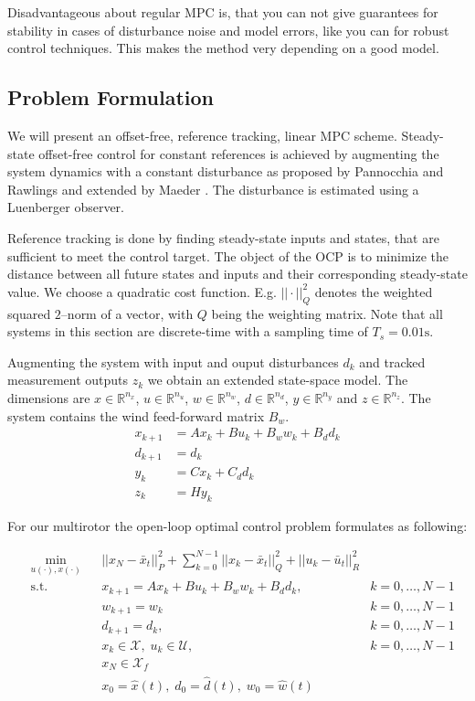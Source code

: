 Disadvantageous about regular MPC is, that you can not give guarantees for stability in cases of disturbance noise and model errors, like you can for robust control techniques. This makes the method very depending on a good model.

\subsection{Problem Formulation}
We will present an offset-free, reference tracking, linear MPC scheme. Steady-state offset-free control for constant references is achieved by augmenting the system dynamics with a constant disturbance as proposed by Pannocchia and Rawlings and extended by Maeder \cite{Pannocchia2003a,Maeder2009}. The disturbance is estimated using a Luenberger observer. 

Reference tracking is done by finding steady-state inputs and states, that are sufficient to meet the control target. The object of the OCP is to minimize the distance between all future states and inputs and their corresponding steady-state value. We choose a quadratic cost function. E.g. $||\cdot||_Q^2$ denotes the weighted squared $2$--norm of a vector, with $Q$ being the weighting matrix. Note that all systems in this section are discrete-time with a sampling time of $T_s = 0.01\si{\second}$. 

Augmenting the system with input and ouput disturbances $d_k$ and tracked measurement outputs $z_k$ we obtain an extended state-space model. The dimensions are $x\in\mathbb{R}^{n_x}$, $u\in\mathbb{R}^{n_u}$, $w\in\mathbb{R}^{n_w}$, $d\in\mathbb{R}^{n_d}$, $y\in\mathbb{R}^{n_y}$ and $z\in\mathbb{R}^{n_z}$. The system contains the wind feed-forward matrix $B_w$.
\begin{align}
x_{k+1} &= A x_k + B u_k + B_w w_k + B_d d_k \label{eq:MPC_dt}\\
d_{k+1} &= d_k \nonumber \\ 
y_{k} &= C x_k + C_d d_k \nonumber \\
z_k &= H y_k 
\end{align}

For our multirotor the open-loop optimal control problem formulates as following:

\begin{align}
&\min_{u(\cdot),x(\cdot)}
& & ||x_N-\bar{x}_t||_P^2 + \sum_{k=0}^{N-1} ||x_k - \bar{x}_t||_Q^2 + ||u_k - \bar{u}_t||_R^2  \nonumber\\
& \text{s.t.} 
& & x_{k+1} = A x_k + B u_k + B_w w_k + B_d d_k, & k = 0, \ldots, N-1 \nonumber\\
& & & w_{k+1} = w_k  & k = 0, \ldots, N-1 \nonumber\\
& & & d_{k+1} = d_k, & k = 0, \ldots, N-1 \nonumber\\
& & & x_k \in \mathcal{X}, \; u_k \in \mathcal{U}, & k = 0, \ldots, N-1 \nonumber\\
& & & x_N \in \mathcal{X}_f \nonumber\\
& & & x_0 = \hat x (t), \; d_0 = \hat d(t), \; w_0 = \hat w(t) \label{eq:mpc_opti}
\end{align}

